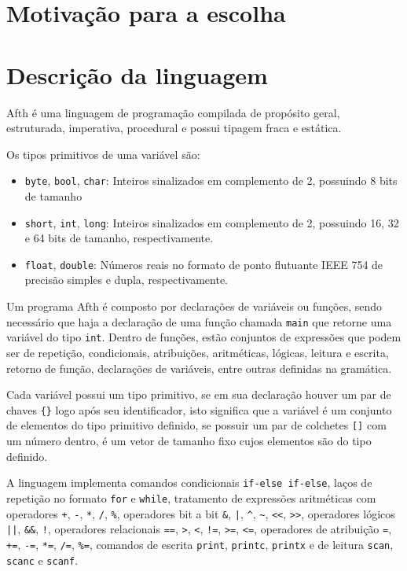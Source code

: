 \documentclass[
	article,			%
	11pt,				%
	oneside,			%
	a4paper,			%
	english,			%
	brazil,				%
	sumario=tradicional
	]{abntex2}
\begin{document}
\section{Motivação para a escolha}

\section{Descrição da linguagem}

Afth é uma linguagem de programação compilada de propósito geral, estruturada, imperativa,
procedural e possui tipagem fraca e estática.

Os tipos primitivos de uma variável são:

\begin{itemize}
	\item \texttt{byte}, \texttt{bool}, \texttt{char}: Inteiros sinalizados em
	      complemento de 2, possuindo 8 bits de tamanho
	\item \texttt{short}, \texttt{int}, \texttt{long}: Inteiros sinalizados em
	      complemento de 2, possuindo 16, 32 e 64 bits de tamanho, respectivamente.
	\item \texttt{float}, \texttt{double}: Números reais no formato de ponto
	      flutuante IEEE 754 de precisão simples e dupla, respectivamente.
\end{itemize}

Um programa Afth é composto por declarações de variáveis ou funções, sendo necessário
que haja a declaração de uma função chamada \texttt{main} que retorne uma variável do tipo
\texttt{int}. Dentro de funções, estão conjuntos de expressões que podem ser de repetição,
condicionais, atribuições, aritméticas, lógicas, leitura e escrita, retorno de função,
declarações de variáveis, entre outras definidas na gramática.

Cada variável possui um tipo primitivo, se em sua declaração houver um par de chaves
\texttt{\{\}} logo após seu identificador, isto significa que a variável é um conjunto
de elementos do tipo primitivo definido, se possuir um par de colchetes \texttt{[]} 
com um número dentro, é um vetor de tamanho fixo cujos elementos são do tipo definido.

A linguagem implementa comandos condicionais \texttt{if-else if-else}, laços de repetição
no formato \texttt{for} e \texttt{while}, tratamento de expressões aritméticas com operadores
\texttt{+}, \texttt{-}, \texttt{*}, \texttt{/}, \texttt{\%}, operadores bit a bit \texttt{\&},
\texttt{|}, \texttt{\^}, \texttt{\~}, \texttt{<<}, \texttt{>>}, operadores lógicos \texttt{||},
\texttt{\&\&}, \texttt{!}, operadores relacionais \texttt{==}, \texttt{>}, \texttt{<}, \texttt{!=},
\texttt{>=}, \texttt{<=}, operadores de atribuição \texttt{=}, \texttt{+=}, \texttt{-=}, \texttt{*=},
\texttt{/=}, \texttt{\%=}, comandos de escrita \texttt{print}, \texttt{printc}, \texttt{printx} e
de leitura \texttt{scan}, \texttt{scanc} e \texttt{scanf}.
\end{document}
